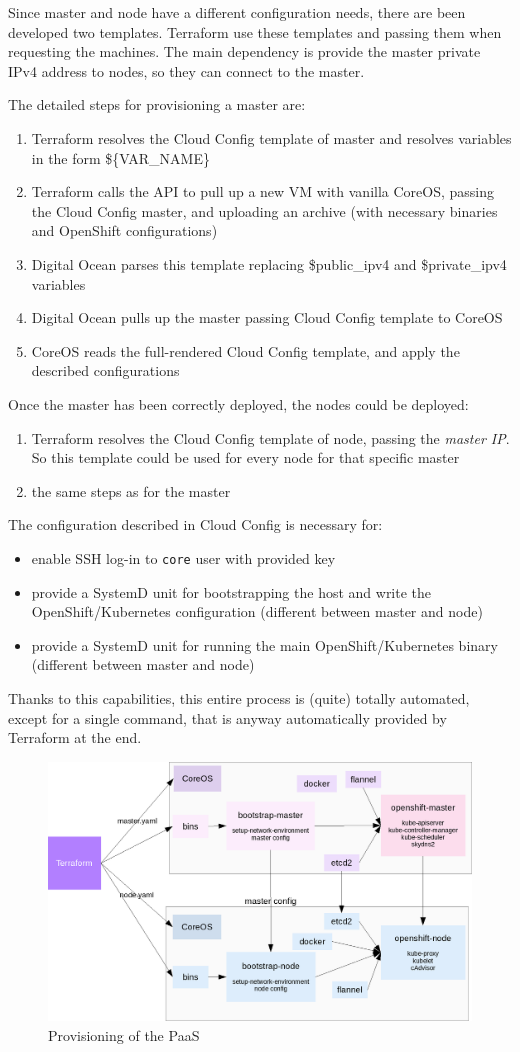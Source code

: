 Since master and node have a different configuration needs, there are been developed two templates.  Terraform use these templates and passing them when requesting the machines. The main dependency is provide the master private IPv4 address to nodes, so they can connect to the master.

The detailed steps for provisioning a master are:
\begin{enumerate}
\item Terraform resolves the Cloud Config template of master and resolves variables in the form \$\{VAR\_NAME\}
\item Terraform calls the API to pull up a new VM with vanilla CoreOS, passing the Cloud Config master, and uploading an archive (with necessary binaries and OpenShift configurations)
\item Digital Ocean parses this template replacing \$public\_ipv4 and \$private\_ipv4 variables
\item Digital Ocean pulls up the master passing Cloud Config template to CoreOS
\item CoreOS reads the full-rendered Cloud Config template, and apply the described configurations
\end{enumerate}

Once the master has been correctly deployed, the nodes could be deployed:
\begin{enumerate}
\item Terraform resolves the Cloud Config template of node, passing the \textit{master IP}.  So this template could be used for every node for that specific master
\item the same steps as for the master
\end{enumerate}

The configuration described in Cloud Config is necessary for:
\begin{itemize}
\item enable SSH log-in to \texttt{core} user with provided key
\item provide a SystemD unit for bootstrapping the host and write the OpenShift/Kubernetes configuration (different between master and node)
\item provide a SystemD unit for running the main OpenShift/Kubernetes binary (different between master and node)
\end{itemize}

Thanks to this capabilities, this entire process is (quite) totally automated, except for a single command, that is anyway automatically provided by Terraform at the end.

\begin{figure}[htbp]
\centering
\includegraphics{media/ch4-bootstrap.png}
\caption{Provisioning of the PaaS}
\end{figure}